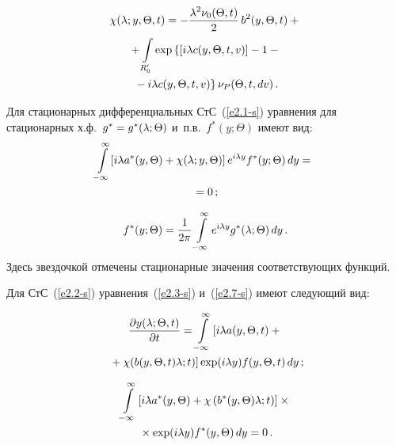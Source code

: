 \begin{multicols}{2}
\begin{enumerate}[1.]
\vspace*{-12pt}

\noindent
\begin{multline*}
\chi(\lambda;y,\Theta,t) =-\displaystyle\frac{\displaystyle \lambda^2 \nu_0 (\Theta,t)\mathstrut}{\displaystyle 2\mathstrut}\, b^2 (y,\Theta,t)+{}\\
{}+ \int\limits_{R_0'} \exp \left\{\left[ i\lambda 
c(y,\Theta,t,v)\right] -1-{}\right.\\
\left.{}-i\lambda c(y,\Theta,t,v)\right\} \nu_P (\Theta,t,dv)\,.
\end{multline*}

Для стационарных дифференциальных СтС~(\ref{e2.1-s}) 
уравнения для стационарных х.ф.\ $g^*\hm=g^*(\la;\Theta)$  
и~п.в.~$f^*(y;\Theta)$ имеют вид:
\begin{multline}
\!\int\limits_{-\infty}^\infty \!\left[ i \lambda a^* (y,\Theta) + \chi( \lambda;y,\Theta)\right]
 e^{i\lambda y} 
f^* (y;\Theta)\, dy ={}\\
{}=0\,;\label{e2.7-s}
\end{multline}

\vspace*{-9pt}

\noindent
\begin{equation*}
f^*(y;\Theta) = \displaystyle\frac{\displaystyle 1\mathstrut}{\displaystyle 2\pi\mathstrut} \int\limits_{-\infty}^\infty e^{i\lambda y} g^* ( \lambda;\Theta)\, dy\,.
\label{e2.8-s}
\end{equation*}
Здесь звездочкой отмечены стационарные значения соответствующих функций.

Для СтС~(\ref{e2.2-s}) уравнения~(\ref{e2.3-s}) и~(\ref{e2.7-s}) имеют сле\-ду\-ющий вид:

\columnbreak

\noindent
    \begin{multline}
    \displaystyle\frac{\displaystyle \partial y ( \lambda;\Theta, t)\mathstrut}{\displaystyle \partial t\mathstrut} = 
    \int\limits_{-\infty}^\infty \left[ i\lambda a (y, \Theta, t) +{}\right.\\
    \left. {}+
    \chi( b(y,\Theta, t)\lambda; t)\right] \exp (i\lambda y) f(y,\Theta,t)\,dy\,;
    \label{e2.9-s}
    \end{multline}
    
    \vspace*{-16pt}
    
    \noindent
    \begin{multline*}
    \int\limits_{-\infty}^\infty  \left[ i\lambda a^* (y, \Theta) + \chi
    \left( b^*(y,\Theta)\lambda; t\right)\right]\times{}\\
    {}\times \exp (i\lambda y) f^*(y,\Theta)\,dy=0\,.
    \end{multline*}


\end{enumerate}
\end{multicols}
